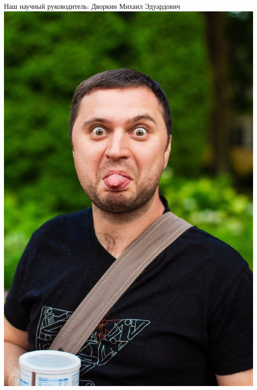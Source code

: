 \documentclass[12pt]{article}
\begin{document}
    

    \newpage %

    Наш научный руководитель: Дворкин Михаил Эдуардович \\
    \includegraphics[scale=0.8]{dvorkin.jpg}\hfill
    

        
\end{document}
